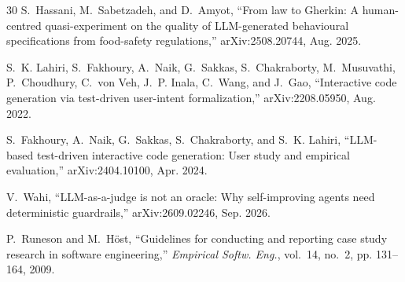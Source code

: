 \documentclass[conference]{IEEEtran}
\begin{document}
\begin{thebibliography}{30}
S.~Hassani, M.~Sabetzadeh, and D.~Amyot, ``From law to Gherkin: A human-centred quasi-experiment on the quality of LLM-generated behavioural specifications from food-safety regulations,'' arXiv:2508.20744, Aug. 2025.

S.~K. Lahiri, S.~Fakhoury, A.~Naik, G.~Sakkas, S.~Chakraborty, M.~Musuvathi, P.~Choudhury, C.~von Veh, J.~P. Inala, C.~Wang, and J.~Gao, ``Interactive code generation via test-driven user-intent formalization,'' arXiv:2208.05950, Aug. 2022.

S.~Fakhoury, A.~Naik, G.~Sakkas, S.~Chakraborty, and S.~K. Lahiri, ``LLM-based test-driven interactive code generation: User study and empirical evaluation,'' arXiv:2404.10100, Apr. 2024.

V.~Wahi, ``LLM-as-a-judge is not an oracle: Why self-improving agents need deterministic guardrails,'' arXiv:2609.02246, Sep. 2026.

P.~Runeson and M.~H\"ost, ``Guidelines for conducting and reporting case study research in software engineering,'' \emph{Empirical Softw. Eng.}, vol.~14, no.~2, pp. 131--164, 2009.

\end{thebibliography}
\end{document}
